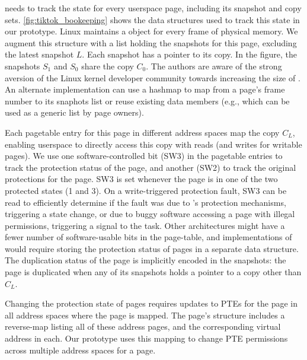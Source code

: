 \documentclass[letterpaper,twocolumn,10pt, anonymous]{article}
\begin{document}
\tiktok needs to track the state for every userspace page, including
its snapshot and copy sets.
\autoref{fig:tiktok_bookeeping} shows the data structures used to
track this state in our prototype.
Linux maintains a  object for every frame of 
physical memory. 
We augment this structure with a list holding the snapshots
for this page, excluding the latest snapshot $L$.
Each snapshot has a pointer to its copy. 
In the figure, the snapshots $S_1$ and $S_0$ share the copy $C_0$.
The authors are aware of the strong aversion of the 
Linux kernel developer community towards increasing the size of 
. 
An alternate implementation can use a hashmap to
map from a page's frame number to its snaphots list or
reuse existing data members (e.g.,  which 
can be used as a generic list by page owners).

Each pagetable entry for this page in different address spaces 
map the copy $C_L$, enabling userspace to directly access this
copy with reads (and writes for writable pages).
We use one software-controlled bit (SW3) in the pagetable entries 
to track the protection status of the page, and another (SW2)\footnotemark
to track the original protections for the page. 
SW3 is set whenever the page is in one of the two protected
states (1 and 3).
On a write-triggered protection fault, SW3 can be read to 
efficiently determine if the fault was due to \tiktok's protection 
mechanisms, triggering a state change, or due to buggy software
accessing a page with illegal permissions, triggering a signal to 
the task.
Other architectures might have a fewer number of software-usable 
bits in the page-table, and implementations of \tiktok would 
require storing the protection status of pages in a separate data structure.
The duplication status of the page is implicitly encoded in the 
snapshots: the page is duplicated when any of its snapshots
holds a pointer to a copy other than $C_L$.


Changing the protection state of pages requires updates to 
PTEs for the page in all address spaces where the page is mapped.
The page's  structure includes a reverse-map
listing all of these address pages, and the corresponding virtual
address in each.
Our prototype uses this mapping to change PTE permissions across
multiple address spaces for a page.
\end{document}
